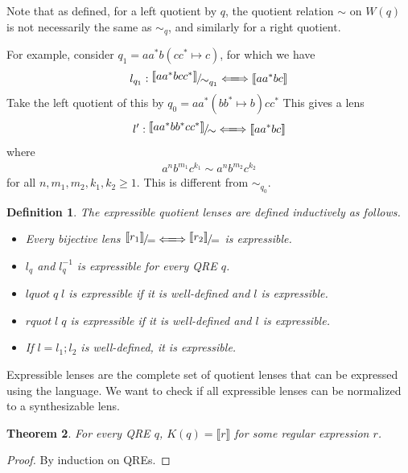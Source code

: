 \documentclass[a4paper,11pt] {article}
\theoremstyle{plain}
\newtheorem{theorem}{Theorem}[section]
\newtheorem{definition}[theorem]{Definition}
\newcommand{\lquot}{\textit{lquot}}
\newcommand{\rquot}{\textit{rquot}}
\newcommand{\lensbetween}[1]{\xLongleftrightarrow{#1}}
\newcommand{\niceFrac}[2]{%
    \raise.5ex\hbox{$#1$}%
    \kern-.1em/\kern-.15em%
    \lower.25ex\hbox{$#2$}}
\begin{document}
Note that as defined, for a left quotient by $q$, the quotient
relation $\sim$ on $W(q)$ is not necessarily the same as
$\sim_q$, and similarly for a right quotient.

For example, consider $q_1 = aa^* b (cc^* \mapsto c)$, for which
we have
\begin{align*}
  l_{q_1}: \niceFrac{\llbracket aa^*bcc^* \rrbracket}{\sim_{q_1}} \lensbetween{}
  \llbracket aa^*bc \rrbracket
\end{align*}
Take the left quotient of this by $q_0 = aa^* (bb^* \mapsto b) cc^*$
This gives a lens
\begin{align*}
  l': \niceFrac{\llbracket aa^*bb^*cc^*\rrbracket}{\sim} \lensbetween{}
  \llbracket aa^*bc \rrbracket
\end{align*}
where
\begin{align*}
  a^n b^{m_1} c^{k_1} \sim a^n b^{m_2} c^{k_2}
\end{align*}
for all $n, m_1, m_2, k_1, k_2 \geq 1$.
This is different from $\sim_{q_0}$.

\begin{definition}
  The expressible quotient lenses are defined inductively
  as follows.
  \begin{itemize}
  \item Every bijective lens
    $\niceFrac{\llbracket r_1 \rrbracket}{=} \lensbetween{}
    \niceFrac{\llbracket r_2 \rrbracket}{=}$
    is expressible.
  \item $l_q$ and $l_q^{-1}$ is expressible for every QRE $q$.
  \item $\lquot \; q \; l$ is expressible if it is well-defined
    and $l$ is expressible.
  \item $\rquot \; l \; q$ is expressible if it is well-defined
    and $l$ is expressible.
  \item If $l = l_1; l_2$ is well-defined, it is expressible.
  \end{itemize}
\end{definition}
Expressible lenses are the complete set of quotient lenses that can
be expressed using the language.
We want to check if all expressible lenses can be normalized to a
synthesizable lens.

\begin{theorem}
  \label{thm:kernel-rep}
  For every QRE $q$, $K(q) = \llbracket r \rrbracket$ for some
  regular expression $r$.
\end{theorem}
\begin{proof}
  By induction on QREs.
\end{proof}
\end{document}
